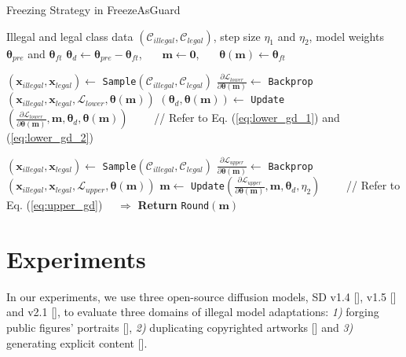 \documentclass{article}
\begin{document}
\vspace{0.05in}
\begin{algorithm}[ht]
	\small
	\caption{Freezing Strategy in FreezeAsGuard}\label{alg:FreezeAsGuard}
	\begin{algorithmic}[1]
		\Require Illegal and legal class data $(\mathcal{C}_{illegal}, \mathcal{C}_{legal})$, step size $\eta_1$ and $\eta_2$, model weights $\boldsymbol{\theta}_{pre}$ and $\boldsymbol{\theta}_{ft}$
		\State $\boldsymbol{\theta}_d \leftarrow \boldsymbol{\theta}_{pre} - \boldsymbol{\theta}_{ft}$, \ \ \ $\mathbf{m} \leftarrow \mathbf{0}$, \ \ \ $\boldsymbol{\theta}(\mathbf{m}) \leftarrow \boldsymbol{\theta}_{ft}$ 
		
		\State $(\mathbf{x}_{illegal}, \mathbf{x}_{legal}) \leftarrow$ \texttt{Sample}$(\mathcal{C}_{illegal}, \mathcal{C}_{legal})$
		\State $\frac{\partial{\mathcal{L}_{lower}}}{\partial{\boldsymbol{\theta}(\mathbf{m})}} \leftarrow$ \texttt{Backprop}$(\mathbf{x}_{illegal}, \mathbf{x}_{legal}, \mathcal{L}_{lower}, \boldsymbol{\theta}(\mathbf{m}))$
		\State $(\boldsymbol{\theta}_d, \boldsymbol{\theta}(\mathbf{m})) \leftarrow$ \texttt{Update}$\left(\frac{\partial{\mathcal{L}_{lower}}}{\partial{\boldsymbol{\theta}(\mathbf{m})}}, \mathbf{m}, \boldsymbol{\theta}_d, \boldsymbol{\theta}(\mathbf{m})\right)$ \ \ \ \ \textcolor{commentcolor}{// Refer to Eq. (\ref{eq:lower_gd_1}) and (\ref{eq:lower_gd_2})}
		\EndFor
		
		\State $(\mathbf{x}_{illegal}, \mathbf{x}_{legal}) \leftarrow$ \texttt{Sample}$(\mathcal{C}_{illegal}, \mathcal{C}_{legal})$
		\State $\frac{\partial{\mathcal{L}_{upper}}}{\partial{\boldsymbol{\theta}(\mathbf{m})}} \leftarrow$ \texttt{Backprop}$(\mathbf{x}_{illegal}, \mathbf{x}_{legal}, \mathcal{L}_{upper}, \boldsymbol{\theta}(\mathbf{m}))$
		\State $\mathbf{m} \leftarrow$ \texttt{Update}$\left(\frac{\partial{\mathcal{L}_{upper}}}{\partial{\boldsymbol{\theta}(\mathbf{m})}}, \mathbf{m}, \boldsymbol{\theta}_d, \eta_2\right)$ \ \ \ \ \textcolor{commentcolor}{// Refer to Eq. (\ref{eq:upper_gd})}
		\EndFor \ \ $\Rightarrow$ \textbf{Return} \texttt{Round}$(\mathbf{m})$
	\end{algorithmic}
\end{algorithm}


\section{Experiments}
\label{sec:experiments}
In our experiments, we use three open-source diffusion models, SD v1.4 [], v1.5 [] and v2.1 [], to evaluate three domains of illegal model adaptations: 
\emph{1)} forging public figures' portraits [], \emph{2)} duplicating copyrighted artworks [] and \emph{3)} generating explicit content []. 
\end{document}
